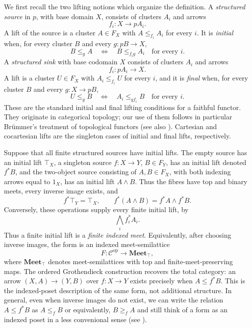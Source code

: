 \documentclass[12pt,oneside,reqno]{amsart}
\theoremstyle{definition}
\theoremstyle{remark}
\newcommand{\C}{\mathcal C}
\newcommand{\Meet}{\mathbf{Meet}_{\top}}
\begin{document}
We first recall the two lifting notions which organize the definition.  A
\emph{structured source} in \(p\), with base domain \(X\), consists of
clusters \(A_i\) and arrows
\[
                         f_i:X\longrightarrow pA_i.
\]
A lift of the source is a cluster \(A\in F_X\) with
\(A\leqslant_{f_i}A_i\) for every \(i\).  It is \emph{initial} when,
for every cluster \(B\) and every \(g:pB\to X\),
\[
 B\leqslant_g A
 \quad\Longleftrightarrow\quad
 B\leqslant_{f_i g}A_i\quad\text{for every }i.
\]
A \emph{structured sink} with base codomain \(X\) consists of clusters
\(A_i\) and arrows
\[
                         f_i:pA_i\longrightarrow X.
\]
A lift is a cluster \(U\in F_X\) with
\(A_i\leqslant_{f_i}U\) for every \(i\), and it is \emph{final} when,
for every cluster \(B\) and every \(g:X\to pB\),
\[
 U\leqslant_gB
 \quad\Longleftrightarrow\quad
 A_i\leqslant_{g f_i}B\quad\text{for every }i.
\]
These are the standard initial and final lifting conditions for a
faithful functor.  They originate in categorical topology; our use of
them follows in particular Br\"ummer's treatment of topological functors \cite{Brummer} (see also
\cite{HerrlichTopological,BrummerHoffmann,GarnerTopological}).  Cartesian
and cocartesian lifts are the singleton cases of initial and final lifts,
respectively.

Suppose that all finite structured sources have initial lifts.  The
empty source has an initial lift \(\top_X\), a singleton source
\(f:X\to Y\), \(B\in F_Y\), has an initial lift denoted \(f^*B\), and
the two-object source consisting of \(A,B\in F_X\), with both indexing
arrows equal to \(1_X\), has an initial lift \(A\wedge B\).  Thus the
fibres have top and binary meets, every
inverse image exists, and
\[
 f^*\top_Y=\top_X,
 \qquad
 f^*(A\wedge B)=f^*A\wedge f^*B.
\]
Conversely, these operations supply every finite initial lift, by
\[
              \bigwedge_i f_i^*A_i.
\]
Thus a finite initial lift is a \emph{finite indexed meet}.  Equivalently,
after choosing inverse images, the form is an indexed meet-semilattice
\begin{equation}\label{eq:indexed-meet-form}
                  F:\C^{\mathrm{op}}\longrightarrow\Meet,
\end{equation}
where \(\Meet\) denotes meet-semilattices with top and
finite-meet-preserving maps.  The ordered Grothendieck construction
recovers the total category: an arrow \((X,A)\to(Y,B)\) over
\(f:X\to Y\) exists precisely when \(A\leqslant f^*B\).  This is the
indexed-poset description of the same form, not additional structure. In general, even when inverse images do not exist, we can write the relation \(A\leqslant f^*B\) as \(A\leqslant_f B \) or equivalently, \(B\geqslant_f A \) and still think of a form as an indexed poset in a less convenional sense (see \cite{DuckertsAntoineGranJanelidze,JanelidzeVanNiekerk}).
\end{document}
